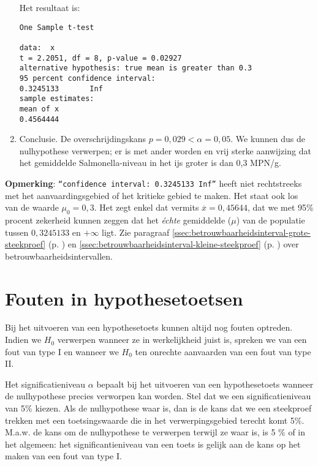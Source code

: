 \begin{example}
\begin{enumerate}
    Het resultaat is:
    
\begin{verbatim}
One Sample t-test

data:  x
t = 2.2051, df = 8, p-value = 0.02927
alternative hypothesis: true mean is greater than 0.3
95 percent confidence interval:
0.3245133       Inf
sample estimates:
mean of x 
0.4564444 
\end{verbatim}
    \item Conclusie. De overschrijdingskans $p = 0,029 < \alpha = 0,05$. We kunnen dus de nulhypothese verwerpen; er is met ander worden en vrij sterke aanwijzing dat het gemiddelde Salmonella-niveau in het ijs groter is dan 0,3 MPN/g.
  \end{enumerate}
\textbf{Opmerking}: \texttt{``confidence interval: 0.3245133 Inf''} heeft niet rechtstreeks met het
aanvaardingsgebied of het kritieke gebied te maken.
Het staat ook los van de waarde $\mu_{0}=0,3$.
Het zegt enkel dat vermits $\overline{x}=0,45644$,
dat we met 95\% procent zekerheid kunnen zeggen dat het \textit{\'echte} gemiddelde ($\mu$) van de populatie
tussen $0,3245133$ en $+\infty$ ligt.
Zie paragraaf \ref{ssec:betrouwbaarheidsinterval-grote-steekproef} (p. \pageref{ssec:betrouwbaarheidsinterval-grote-steekproef})
en \ref{ssec:betrouwbaarheidsinterval-kleine-steekproef} (p. \pageref{ssec:betrouwbaarheidsinterval-kleine-steekproef})
over betrouwbaarheidsintervallen.
\end{example}


\section{Fouten in hypothesetoetsen}

Bij het uitvoeren van een hypothesetoets kunnen altijd nog fouten optreden. Indien we $H_{0}$ verwerpen wanneer ze in werkelijkheid juist is, spreken we van een fout van type I en wanneer we $H_{0}$ ten onrechte aanvaarden van een fout van type II.

Het significatieniveau $\alpha$ bepaalt bij het uitvoeren van een hypothesetoets wanneer de nulhypothese precies verworpen kan worden. Stel dat we een significatieniveau van 5\% kiezen. Als de nulhypothese waar is, dan is de kans dat we een steekproef trekken met een toetsingswaarde die in het verwerpingsgebied terecht komt 5\%. M.a.w. de kans om de nulhypothese te verwerpen terwijl ze waar is, is 5 \% of in het algemeen: het significantieniveau van een toets is gelijk aan de kans op het maken van een fout van type I.

